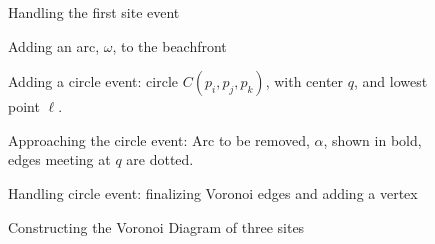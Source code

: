 \documentclass[12pt,twoside]{reedthesis}
\begin{document}
      \begin{figure}[!htb]
        \centering
        \begin{subtable}{0.475\textwidth}
          \centering
          
          \caption{Handling the first site event}
          \label{fig:fortune_0}
        \end{subtable}%
        \begin{subtable}{0.475\textwidth}
          \centering
          
          \caption{Adding an arc, $\omega$, to the beachfront}
          \label{fig:fortune_1}
        \end{subtable}
      \end{figure}
      \begin{figure}[!htb]
      \ContinuedFloat
        \begin{subtable}{0.475\textwidth}
          \centering
          
          \caption{Adding a circle event: circle $C(p_{i}, p_{j}, p_{k})$, with center $q$, and lowest point $\ell$.}
          \label{fig:fortune_2}
        \end{subtable}
        \begin{subtable}{0.475\textwidth}
          \centering
          
          \caption{Approaching the circle event: Arc to be removed, $\alpha$, shown in bold, edges meeting at $q$ are dotted.}
          \label{fig:fortune_3}
        \end{subtable}
      \end{figure}

      \begin{figure}[!htb]
      \ContinuedFloat
      \centering
        \begin{subtable}{0.475\textwidth}
          \centering
          
          \caption{Handling circle event: finalizing Voronoi edges and adding a vertex}
          \label{fig:fortune_done}
        \end{subtable}
        \caption{Constructing the Voronoi Diagram of three sites}
        \label{fig:construct_vorof_3}
      \end{figure}
  \clearpage
\end{document}
